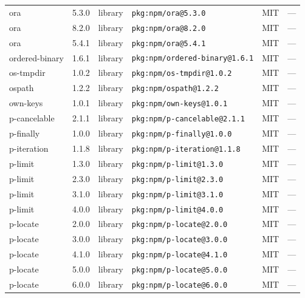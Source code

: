 \documentclass[11pt,a4paper]{article}
\begin{document}
\begin{longtable}{|p{4cm}|p{2cm}|p{1.6cm}|p{5cm}|p{1.5cm}|p{3.5cm}|}
\raggedright ora & 5.3.0 & library & \small\texttt{pkg:npm/ora@5.3.0} & MIT & \small — \\
\raggedright ora & 8.2.0 & library & \small\texttt{pkg:npm/ora@8.2.0} & MIT & \small — \\
\raggedright ora & 5.4.1 & library & \small\texttt{pkg:npm/ora@5.4.1} & MIT & \small — \\
\raggedright ordered-binary & 1.6.1 & library & \small\texttt{pkg:npm/ordered-binary@1.6.1} & MIT & \small — \\
\raggedright os-tmpdir & 1.0.2 & library & \small\texttt{pkg:npm/os-tmpdir@1.0.2} & MIT & \small — \\
\raggedright ospath & 1.2.2 & library & \small\texttt{pkg:npm/ospath@1.2.2} & MIT & \small — \\
\raggedright own-keys & 1.0.1 & library & \small\texttt{pkg:npm/own-keys@1.0.1} & MIT & \small — \\
\raggedright p-cancelable & 2.1.1 & library & \small\texttt{pkg:npm/p-cancelable@2.1.1} & MIT & \small — \\
\raggedright p-finally & 1.0.0 & library & \small\texttt{pkg:npm/p-finally@1.0.0} & MIT & \small — \\
\raggedright p-iteration & 1.1.8 & library & \small\texttt{pkg:npm/p-iteration@1.1.8} & MIT & \small — \\
\raggedright p-limit & 1.3.0 & library & \small\texttt{pkg:npm/p-limit@1.3.0} & MIT & \small — \\
\raggedright p-limit & 2.3.0 & library & \small\texttt{pkg:npm/p-limit@2.3.0} & MIT & \small — \\
\raggedright p-limit & 3.1.0 & library & \small\texttt{pkg:npm/p-limit@3.1.0} & MIT & \small — \\
\raggedright p-limit & 4.0.0 & library & \small\texttt{pkg:npm/p-limit@4.0.0} & MIT & \small — \\
\raggedright p-locate & 2.0.0 & library & \small\texttt{pkg:npm/p-locate@2.0.0} & MIT & \small — \\
\raggedright p-locate & 3.0.0 & library & \small\texttt{pkg:npm/p-locate@3.0.0} & MIT & \small — \\
\raggedright p-locate & 4.1.0 & library & \small\texttt{pkg:npm/p-locate@4.1.0} & MIT & \small — \\
\raggedright p-locate & 5.0.0 & library & \small\texttt{pkg:npm/p-locate@5.0.0} & MIT & \small — \\
\raggedright p-locate & 6.0.0 & library & \small\texttt{pkg:npm/p-locate@6.0.0} & MIT & \small — \\

\end{longtable}
\end{document}

